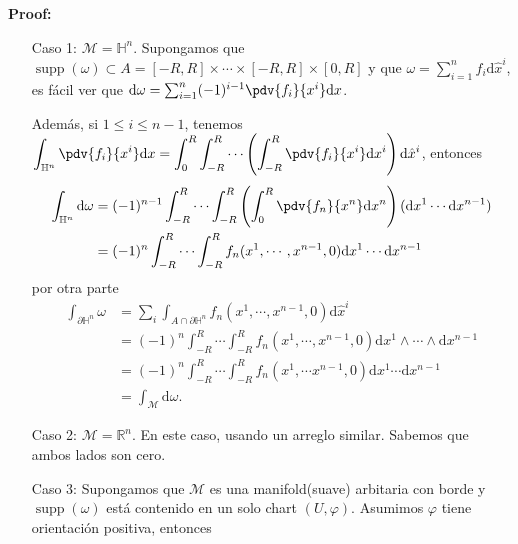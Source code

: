 \documentclass[../main]{subfiles}
\begin{document}
\textbf{Proof:}
\begin{enumerate}[itemindent=1cm]
    \item[Caso 1:] $\mathcal{M}=\mathbb{H}^n$. Supongamos que $\operatorname{supp} (\omega) \subset A=[-R, R] \times \cdots \times [-R, R] \times [0, R]$ y que $\omega=\sum_{i=1}^n f_i \mathrm{d}\hat{x}^{i}$, es fácil ver que $\mathrm{d}\omega=\sum_{i=1}^n (-1)^{i-1}\pdv{f_i}{x^{i}}\mathrm{d}x$.
    
    Además, si $1\leq i \leq n-1$, tenemos $\displaystyle \int_{\mathbb{H}^n} \pdv{f_i}{x^{i}}\mathrm{d}x=\int_0^{R} \int_{-R}^R \cdots \left(\int_{-R}^R \pdv{f_i}{x^{i}}\mathrm{d}x^{i}\right)\mathrm{d}\hat{x}^{i}$, entonces 
    \begin{equation}
        \begin{split}
            \int_{\mathbb{H}^n} \mathrm{d}\omega&=(-1)^{n-1} \int_{-R}^R \cdots \int_{-R}^R \left(\int_0^R \pdv{f_n}{x^n}\mathrm{d}x^n\right)(\mathrm{d}x^1 \cdots \mathrm{d}x^{n-1})\\
            &=(-1)^n \int_{-R}^R \cdots \int_{-R}^R f_n(x^1, \cdots, x^{n-1}, 0)\mathrm{d}x^1 \cdots \mathrm{d}x^{n-1}
        \end{split}
    \end{equation}
    por otra parte 
    \begin{equation}
        \begin{split}
            \int_{\partial \mathbb{H}^n} \omega&= \sum_i \int_{A \cap \partial \mathbb{H}^n} f_n(x^1, \cdots, x^{n-1}, 0)\mathrm{d}\hat{x}^{i} \\
            &=(-1)^n \int_{-R}^R \cdots \int_{-R}^R f_n(x^1, \cdots, x^{n-1}, 0)\mathrm{d}x^1 \wedge \cdots \wedge \mathrm{d}x^{n-1}\\
            &=(-1)^n \int_{-R}^R \cdots \int_{-R}^R f_n(x^1, \cdots x^{n-1}, 0) \mathrm{d}x^1 \cdots \mathrm{d}x^{n-1}\\
            &=\int_{\mathcal{M}} \mathrm{d}\omega.
        \end{split}
    \end{equation}
    \item[Caso 2:] $\mathcal{M}=\mathbb{R}^n$. En este caso, usando un arreglo similar. Sabemos que ambos lados son cero.
    \item[Caso 3:] Supongamos que $\mathcal{M}$ es una manifold(suave) arbitaria con borde y $\operatorname{supp}(\omega)$ está contenido en un solo chart $(U, \varphi)$. Asumimos $\varphi$ tiene orientación positiva, entonces
    \begin{equation}

\end{equation}
\end{enumerate}
\end{document}
